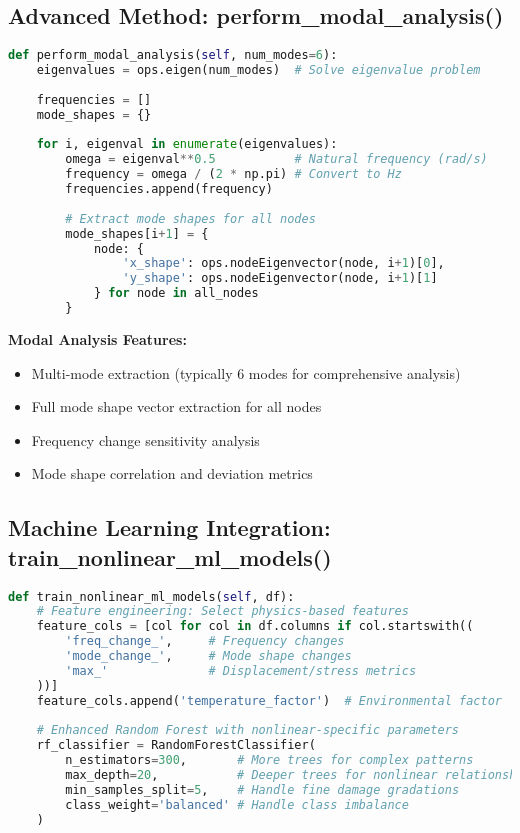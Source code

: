 \documentclass[12pt,a4paper]{article}
\begin{document}
\subsection{Advanced Method: perform\_modal\_analysis()}

\begin{lstlisting}[language=Python, caption=Modal Analysis Implementation]
def perform_modal_analysis(self, num_modes=6):
    eigenvalues = ops.eigen(num_modes)  # Solve eigenvalue problem
    
    frequencies = []
    mode_shapes = {}
    
    for i, eigenval in enumerate(eigenvalues):
        omega = eigenval**0.5           # Natural frequency (rad/s)
        frequency = omega / (2 * np.pi) # Convert to Hz
        frequencies.append(frequency)
        
        # Extract mode shapes for all nodes
        mode_shapes[i+1] = {
            node: {
                'x_shape': ops.nodeEigenvector(node, i+1)[0],
                'y_shape': ops.nodeEigenvector(node, i+1)[1]
            } for node in all_nodes
        }
\end{lstlisting}

\textbf{Modal Analysis Features:}
\begin{itemize}
    \item Multi-mode extraction (typically 6 modes for comprehensive analysis)
    \item Full mode shape vector extraction for all nodes
    \item Frequency change sensitivity analysis
    \item Mode shape correlation and deviation metrics
\end{itemize}

\subsection{Machine Learning Integration: train\_nonlinear\_ml\_models()}

\begin{lstlisting}[language=Python, caption=Machine Learning Model Training]
def train_nonlinear_ml_models(self, df):
    # Feature engineering: Select physics-based features
    feature_cols = [col for col in df.columns if col.startswith((
        'freq_change_',     # Frequency changes
        'mode_change_',     # Mode shape changes  
        'max_'              # Displacement/stress metrics
    ))]
    feature_cols.append('temperature_factor')  # Environmental factor
    
    # Enhanced Random Forest with nonlinear-specific parameters
    rf_classifier = RandomForestClassifier(
        n_estimators=300,       # More trees for complex patterns
        max_depth=20,           # Deeper trees for nonlinear relationships
        min_samples_split=5,    # Handle fine damage gradations
        class_weight='balanced' # Handle class imbalance
    )
\end{lstlisting}
\end{document}
